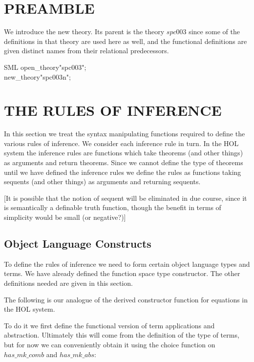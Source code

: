 \documentclass[a4paper,11pt,titlepage]{article}
\begin{document}
\begin{titlepage}
\section{PREAMBLE}

We introduce the new theory.
Its parent is the theory $spc003$ since some of the definitions in that theory are used here as well, and the functional definitions are given distinct names from their relational predecessors.

\begin{GFT}{SML}
\+open\_theory"spc003";\\
\+new\_theory\PrNL{}"spc003n"\PrNN{};\\
\end{GFT}
\section{THE RULES OF INFERENCE} \label{RULESOFINFERENCE}

In this section we treat the syntax manipulating
functions required to define the various rules of
inference. We consider each inference rule in turn.
In the HOL system the inference rules are functions
which take theorems (and other things) as arguments
and return theorems. Since we cannot define
the type of theorems until we have defined the inference
rules we define the rules as functions taking
sequents (and other things) as arguments and returning
sequents.

[It is possible that the notion of sequent will be eliminated in due course, since it is semantically a definable truth function, though the benefit in terms of simplicity would be small (or negative?)] 

\subsection{Object Language Constructs}

To define the rules of inference we need to form
certain object language types and terms.
We have already defined the function space type
constructor.
The other definitions needed are given in this
section.

The following is our analogue of the derived
constructor function for equations in the HOL system.

To do it we first define the functional version of term applications and abstraction.
Ultimately this will come from the definition of the type of terms, but for now we can conveniently obtain it using the choice function on $has\_mk\_comb$ and $has\_mk\_abs$:


\end{titlepage}
\end{document}
